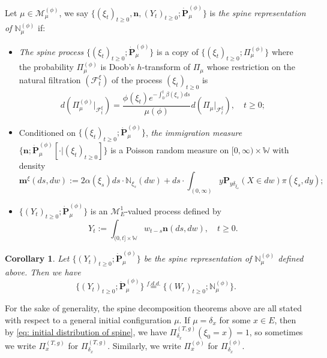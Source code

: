 \documentclass[12pt, a4paper]{amsart}
\newtheorem{cro}[thm]{Corollary}
\theoremstyle{definition}
\numberwithin{equation}{section}
\begin{document}
	Let $\mu \in \mathcal M^{(\phi)}_\mu$, we say
	$\{(\xi_t)_{t\geq 0}, \mathbf n, (Y_t)_{ t\geq 0}; \dot {\mathbf P}^{(\phi)}_\mu\}$
	is \emph{the spine representation of $\mathbb N^{(\phi)}_\mu$}  if:
\begin{itemize}
\item
	\emph{The spine process} $\{(\xi_t)_{t\geq 0}; \dot{\mathbf P}^{(\phi)}_\mu\}$ is a copy of $\{(\xi_t)_{t\geq 0}; \Pi^{(\phi)}_{\mu}\}$ where the probability $\Pi_{\mu}^{(\phi)}$ is Doob's $h$-transform of $\Pi_\mu$ whose restriction on the natural filtration $(\mathscr F_t^\xi)$ of the process $(\xi_t)_{t\geq 0}$ is
\[
	d(\Pi_{\mu}^{(\phi)} |_{\mathscr F_t^\xi})
	= \frac{\phi(\xi_t)e^{-\int_0^t \beta(\xi_s)ds}}{\mu(\phi)} d(\Pi_{\mu} |_{\mathscr F_t^\xi}),
	\quad t\geq 0;
\]
\item
	Conditioned on $\{(\xi_t)_{t\geq 0}; \dot{\mathbf P}^{(\phi)}_\mu\}$, \emph{the immigration measure} $\{\mathbf n; \dot{\mathbf P}^{(\phi)}_\mu[\cdot |(\xi_t)_{t\geq 0}]\}$ is a Poisson random measure on $[0,\infty ) \times \mathbb W$ with
   density
\[\label{eq:meanMeasImmigr}
	\mathbf m^\xi(ds,dw)
	:= 2 \alpha(\xi_s) ds \cdot \mathbb N_{\xi_s}(dw) + ds \cdot \int_{(0,\infty)} y \mathbf P_{y\delta_{\xi_s}}(X\in dw) \pi(\xi_s,dy);
\]
\item
	$\{(Y_t)_{t\geq 0}; \dot{\mathbf P}^{(\phi)}_\mu\}$ is an $\mathcal M^1_E$-valued process defined by
\[\label{eq:defSpinImmigr}
	Y_t
	:= \int_{(0,t] \times \mathbb W} w_{t-s} \mathbf n(ds,dw),
	\quad t\geq 0.
\]
\end{itemize}

\begin{cro}
	Let $\{(Y_t)_{t\geq 0}; \dot {\mathbf P}^{(\phi)}_\mu\}$ be the spine representation of $\mathbb N^{(\phi)}_\mu$ defined above.
	Then we have
\[
	\{(Y_t)_{t\geq 0}; \dot{\mathbf P}^{(\phi)}_\mu\}
	\overset{f.d.d.}{=} \{(W_t)_{t\geq 0}; \mathbb N_\mu^{(\phi)}\}.
\]
\end{cro}

	For the sake of generality, the spine decomposition theorems above are all stated with respect to a general initial configuration $\mu$.
	If $\mu = \delta_x$ for some $x\in E$, then by
	\eqref{eq: initial distribution of spine}, we have $\Pi_{\delta_x}^{(T,g)} (\xi_0 = x) = 1$, so sometimes we write $\Pi_x^{(T,g)}$ for $\Pi_{\delta_x}^{(T,g)}$.
	Similarly, we write $\Pi_x^{(\phi)}$ for $\Pi_{\delta_x}^{(\phi)}$.
\end{document}
